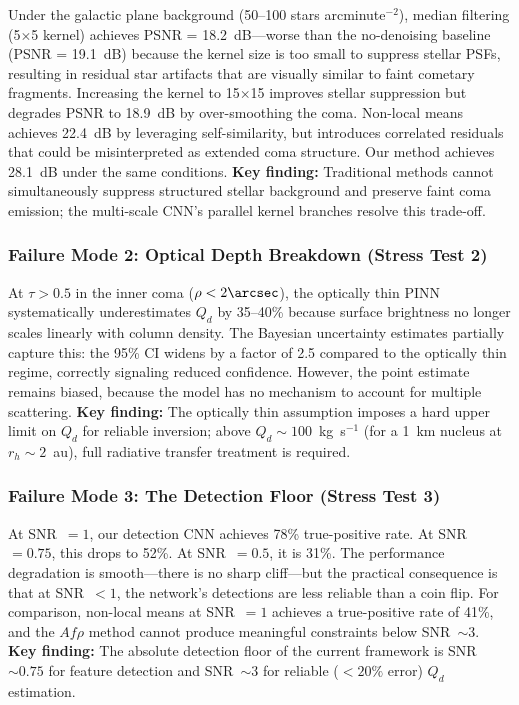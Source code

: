 \documentclass[usenatbib]{mnras}
\begin{document}
Under the galactic plane background (50--100 stars arcminute$^{-2}$), median filtering (5$\times$5 kernel) achieves PSNR = 18.2~dB---worse than the no-denoising baseline (PSNR = 19.1~dB) because the kernel size is too small to suppress stellar PSFs, resulting in residual star artifacts that are visually similar to faint cometary fragments. Increasing the kernel to 15$\times$15 improves stellar suppression but degrades PSNR to 18.9~dB by over-smoothing the coma. Non-local means achieves 22.4~dB by leveraging self-similarity, but introduces correlated residuals that could be misinterpreted as extended coma structure. Our method achieves 28.1~dB under the same conditions. \textbf{Key finding:} Traditional methods cannot simultaneously suppress structured stellar background and preserve faint coma emission; the multi-scale CNN's parallel kernel branches resolve this trade-off.

\subsubsection{Failure Mode 2: Optical Depth Breakdown (Stress Test 2)}

At $\tau > 0.5$ in the inner coma ($\rho < 2\arcsec$), the optically thin PINN systematically underestimates $Q_d$ by 35--40\% because surface brightness no longer scales linearly with column density. The Bayesian uncertainty estimates partially capture this: the 95\% CI widens by a factor of 2.5 compared to the optically thin regime, correctly signaling reduced confidence. However, the point estimate remains biased, because the model has no mechanism to account for multiple scattering. \textbf{Key finding:} The optically thin assumption imposes a hard upper limit on $Q_d$ for reliable inversion; above $Q_d \sim 100$~kg~s$^{-1}$ (for a 1~km nucleus at $r_h \sim 2$~au), full radiative transfer treatment is required.

\subsubsection{Failure Mode 3: The Detection Floor (Stress Test 3)}

At SNR~$=1$, our detection CNN achieves 78\% true-positive rate. At SNR~$=0.75$, this drops to 52\%. At SNR~$=0.5$, it is 31\%. The performance degradation is smooth---there is no sharp cliff---but the practical consequence is that at SNR~$<1$, the network's detections are less reliable than a coin flip. For comparison, non-local means at SNR~$=1$ achieves a true-positive rate of 41\%, and the $Af\rho$ method cannot produce meaningful constraints below SNR~$\sim 3$. \textbf{Key finding:} The absolute detection floor of the current framework is SNR~$\sim 0.75$ for feature detection and SNR~$\sim 3$ for reliable ($<20\%$ error) $Q_d$ estimation.
\end{document}
